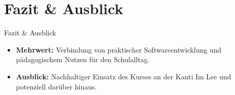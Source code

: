\documentclass[aspectratio=169]{beamer}
\begin{document}
\section{Fazit \& Ausblick}
\begin{frame}{Fazit \& Ausblick}
    \begin{itemize}
        \item \textbf{Mehrwert:} Verbindung von praktischer Softwareentwicklung und pädagogischem Nutzen für den Schulalltag.
        \item \textbf{Ausblick:} Nachhaltiger Einsatz des Kurses an der Kanti Im Lee und potenziell darüber hinaus.
    \end{itemize}
\end{frame}
\end{document}
